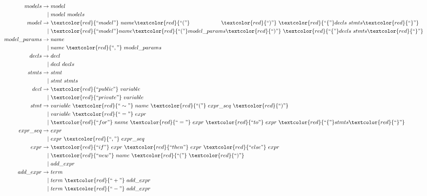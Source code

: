 \begin{align*}
           models \rightarrow & ~model \\
                   |& ~model ~models \\       
            model \rightarrow & ~\textcolor{red}{``model"} ~name \textcolor{red}{``("}~~~~~~~~~~~~~~~~~ \textcolor{red}{``)"} ~ \textcolor{red}{``\{"} decls ~stmts \textcolor{red}{``\}"} \\
                   |& ~\textcolor{red}{``model"} name \textcolor{red}{``("} model\_params \textcolor{red}{``)"} ~\textcolor{red}{``\{"} decls ~stmts \textcolor{red}{``\}"} \\         
     model\_params \rightarrow & ~name \\
                   |& ~name ~\textcolor{red}{``,"}~ model\_params \\        
            decls \rightarrow & ~decl \\
                   |& ~decl ~decls \\ 
            stmts \rightarrow & ~stmt \\
                   |& ~stmt ~stmts \\        
             decl \rightarrow & ~\textcolor{red}{``public"} ~variable \\
                   |& ~\textcolor{red}{``private"} ~variable \\         
             stmt \rightarrow & ~variable ~\textcolor{red}{``\sim"} ~name ~\textcolor{red}{``("} ~expr\_seq ~\textcolor{red}{``)"} \\
                   |& ~variable ~\textcolor{red}{``="} ~expr \\
                   |& ~\textcolor{red}{``for"} ~name ~\textcolor{red}{``="} ~expr ~\textcolor{red}{``to"} ~expr ~\textcolor{red}{``\{"} stmts \textcolor{red}{``\}"} \\        
         expr\_seq \rightarrow & ~expr \\
                   |& ~expr ~\textcolor{red}{``,"} ~expr\_seq \\      
             expr \rightarrow & ~\textcolor{red}{``if"} ~expr ~\textcolor{red}{``then"} ~expr ~\textcolor{red}{``else"} ~expr \\
                   |& ~\textcolor{red}{``new"} ~name ~\textcolor{red}{``("} ~\textcolor{red}{``)"} \\
                   |& ~add\_expr \\  
         add\_expr \rightarrow & ~term \\
                   |& ~term ~\textcolor{red}{``+"} ~add\_expr \\
                   |& ~term ~\textcolor{red}{``-"} ~add\_expr     
\end{align*}

